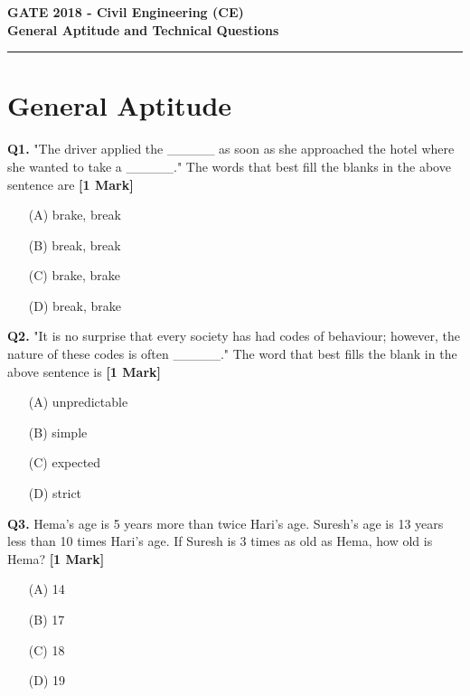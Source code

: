 \documentclass[11pt]{article}
\newcommand{\questiona}[2]{
    \noindent\textbf{Q#2.} #1 \hfill \textbf{[1 Mark]}
}
\begin{document}
\begin{center}
    \Large\textbf{GATE 2018 - Civil Engineering (CE)} \\
    \large\textbf{General Aptitude and Technical Questions} \\
    \rule{\textwidth}{0.5pt} %
\end{center}

\vspace{0.5cm}

\section*{General Aptitude}

\questiona{"The driver applied the \_\_\_\_\_ as soon as she approached the hotel where she wanted to take a \_\_\_\_\_." The words that best fill the blanks in the above sentence are}{1}
\begin{enumerate}
    \item[(A)] brake, break  
    \item[(B)] break, break  
    \item[(C)] brake, brake  
    \item[(D)] break, brake  
\end{enumerate}
\vspace{0.5cm}

\questiona{"It is no surprise that every society has had codes of behaviour; however, the nature of these codes is often \_\_\_\_\_." The word that best fills the blank in the above sentence is}{2}
\begin{enumerate}
    \item[(A)] unpredictable  
    \item[(B)] simple  
    \item[(C)] expected  
    \item[(D)] strict  
\end{enumerate}
\vspace{0.5cm}

\questiona{Hema's age is 5 years more than twice Hari's age. Suresh's age is 13 years less than 10 times Hari's age. If Suresh is 3 times as old as Hema, how old is Hema?}{3}
\begin{enumerate}
    \item[(A)] 14  
    \item[(B)] 17  
    \item[(C)] 18  
    \item[(D)] 19  
\end{enumerate}
\vspace{0.5cm}
\end{document}
